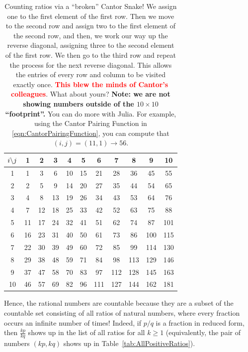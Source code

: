 \begin{table}
\centering
\renewcommand{\arraystretch}{1.5}
\begin{tabular}{c | *{10}{@{\hspace{4mm}}c}}
$\mathlarger{i \mathbf{\backslash} j}$   & 1 & 2 & 3 & 4 & 5 & 6 & 7 & 8 & 9 & 10 \\
\hline {} & 1 & 3 & 6 & 10 & 15 & 21 & 28 & 36 & 45 & 55 \\
2 & 2 & 5 & 9 & 14 & 20 & 27 & 35 & 44 & 54 & 65 \\
3 & 4 & 8 & 13 & 19 & 26 & 34 & 43 & 53 & 64 & 76 \\
4 & 7 & 12 & 18 & 25 & 33 & 42 & 52 & 63 & 75 & 88 \\
5 & 11 & 17 & 24 & 32 & 41 & 51 & 62 & 74 & 87 & 101 \\
6 & 16 & 23 & 31 & 40 & 50 & 61 & 73 & 86 & 100 & 115 \\
7 & 22 & 30 & 39 & 49 & 60 & 72 & 85 & 99 & 114 & 130 \\
8 & 29 & 38 & 48 & 59 & 71 & 84 & 98 & 113 & 129 & 146 \\
9 & 37 & 47 & 58 & 70 & 83 & 97 & 112 & 128 & 145 & 163 \\
10 & 46 & 57 & 69 & 82 & 96 & 111 & 127 & 144 & 162 & 181 \\
\end{tabular}
\caption{Counting ratios via a ``broken'' Cantor Snake! We assign one to the first element of the first row. Then we move to the second row and assign two to the first element of the second row, and then, we work our way up the reverse diagonal, assigning three to the second element of the first row. We then go to the third row and repeat the process for the next reverse diagonal. This allows the entries of every row and column to be visited exactly once. \textcolor{red}{\bf This blew the minds of Cantor's colleagues}. What about yours? \textbf{Note: we are not showing numbers outside of the $10 \times 10$ ``footprint''.} You can do more with Julia. For example, using the Cantor Pairing Function in \eqref{eqn:CantorPairingFunction}, you can compute that $(i,j)=(11,1) \to 56.$}
\label{tab:CantorSnake}
\end{table}


Hence, the rational numbers are countable because they are a subset of the countable set consisting of all ratios of natural numbers, where every fraction occurs an infinite number of times! Indeed, if $p/q$ is a fraction in reduced form, then $\frac{k p}{k q}$ shows up in the list of all ratios for all $k\ge 1$ (equivalently, the pair of numbers $(kp, kq)$ shows up in Table~\ref{tab:AllPositiveRatios}). 

